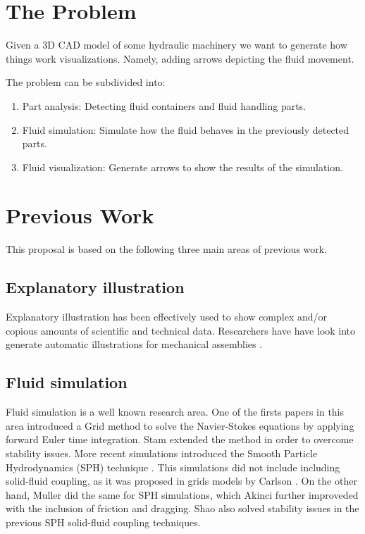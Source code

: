 \documentclass[11pt]{report}
\begin{document}

\section{The Problem}
\label{sec:problem}

Given a 3D CAD model of some hydraulic machinery we want to generate how things work visualizations.
Namely, adding arrows depicting the fluid movement.

The problem can be subdivided into:
\begin{enumerate}
\item Part analysis: Detecting fluid containers and fluid handling parts.
\item Fluid simulation: Simulate how the fluid behaves in the previously detected parts.
\item Fluid visualization: Generate arrows to show the results of the simulation. 
\end{enumerate}

\section{Previous Work}

This proposal is based on the following three main areas of previous work.

\subsection{Explanatory illustration}

Explanatory illustration has been effectively used to show complex and/or copious amounts of  scientific and technical data.
Researchers have have look into generate automatic illustrations for mechanical assemblies \cite{Mitra2010}.


\subsection{Fluid simulation}

Fluid simulation is a well known research area. 
One of the firsts papers in this area introduced a Grid method \cite{Foster1996} to solve the Navier-Stokes equations by applying forward Euler time integration. 
Stam \cite{Stam1999} extended the method in order to overcome stability issues. 
More recent simulations introduced the Smooth Particle Hydrodynamics (SPH) technique \cite{DesbrunMathieuandGascuel1996}. 
This simulations did not include including solid-fluid coupling, as it was proposed in grids models by Carlson \cite{Carlson2004}. 
On the other hand, Muller \cite{Muller2004} did the same for SPH simulations, which Akinci \cite{Akinci2012} further improveded with the inclusion of friction and dragging. 
Shao \cite{Shao2014} also solved stability issues in the previous SPH solid-fluid coupling techniques.
\end{document}
